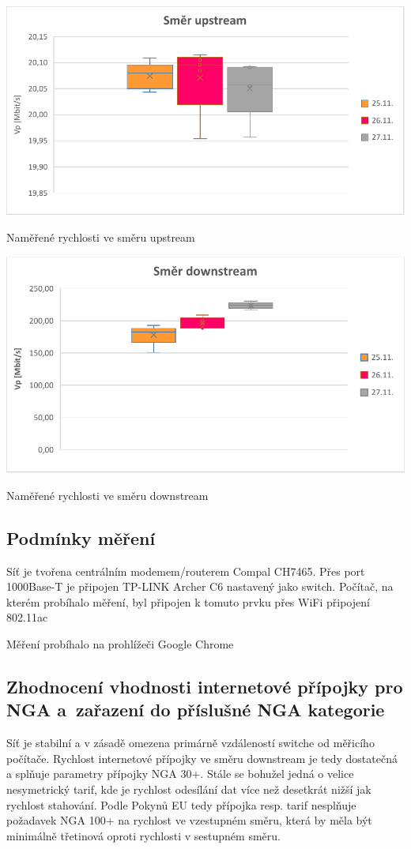 \documentclass[a4paper,12pt]{article}   %
\begin{document}
\begin{graf}[hbtp]
  \centering
  \includegraphics[width = .6\textwidth]{tsi_uplink.pdf}
  \caption{Naměřené rychlosti ve směru upstream}
  \label{fig:up}
\end{graf}

\begin{graf}[hbtp]
  \centering
  \includegraphics[width = .6\textwidth]{tsi_downlink.pdf}
  \caption{Naměřené rychlosti ve směru downstream}
  \label{fig:down}
\end{graf}



\subsection*{Podmínky měření}
Síť je tvořena centrálním modemem/routerem Compal CH7465. Přes port 1000Base-T je připojen TP-LINK Archer C6 nastavený jako switch. Počítač, na kterém probíhalo měření, byl připojen k tomuto prvku přes WiFi připojení 802.11ac

Měření probíhalo na prohlížeči Google Chrome

\subsection*{Zhodnocení vhodnosti internetové přípojky pro NGA a~zařazení do příslušné NGA kategorie}
Síť je stabilní a v zásadě omezena primárně vzdáleností switche od měřicího počítače. Rychlost internetové přípojky ve směru downstream je tedy dostatečná a splňuje parametry přípojky NGA 30+. Stále se bohužel jedná o velice nesymetrický tarif, kde je rychlost odesílání dat více než desetkrát nižší jak rychlost stahování. Podle Pokynů EU tedy přípojka resp. tarif nesplňuje požadavek NGA 100+ na rychlost ve vzestupném směru, která by měla být minimálně třetinová oproti rychlosti v sestupném směru.
\end{document}
